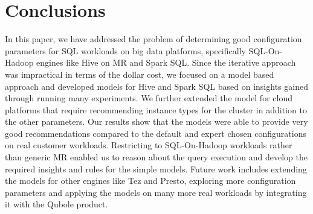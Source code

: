\section{Conclusions}
\label{sec:conclusions}
In this paper, we have addressed the problem of determining good configuration parameters for SQL workloads on big data platforms, specifically SQL-On-Hadoop engines like Hive on MR and Spark SQL.  Since the iterative approach was impractical in terms of the dollar cost, we focused on a model based approach and developed models for Hive and Spark SQL based on insights gained through running many experiments. We further extended the model for cloud platforms that require recommending instance types for the cluster in addition to the other parameters. Our results show that the models were able to provide very good recommendations compared to the default and expert chosen configurations on real customer workloads. 
  Restricting to SQL-On-Hadoop workloads rather than generic MR enabled us to reason about the query execution and develop the required insights and rules for the simple models. Future work includes extending the models for other engines like Tez and Presto, exploring more configuration parameters and applying the models on many more real workloads by integrating it with the Qubole product. 
